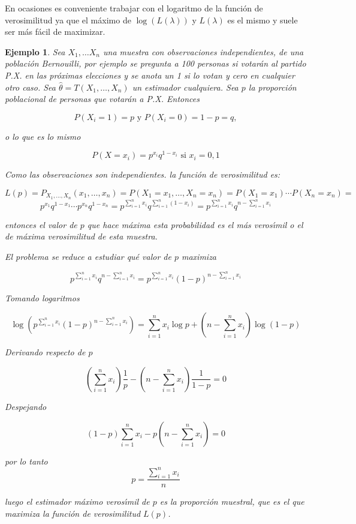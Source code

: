 \documentclass[12pt]{report}
\newtheorem{example}[definition]{Ejemplo}
\begin{document}
En ocasiones  es conveniente trabajar con el logaritmo de la funci\'on de verosimilitud ya
que el m\'aximo de $\log(L(\lambda))$ y $L(\lambda)$ es el mismo y suele ser m\'as f\'acil de
maximizar.




\begin{example}
 Sea $X_{1},\ldots X_{n}$ una muestra con observaciones
independientes, de una poblaci\'on Bernouilli, por ejemplo se pregunta a 100 personas si
votar\'an al partido P.X. en las pr\'oximas elecciones y se anota un 1 si lo votan y cero en
cualquier otro caso. Sea $\hat{\theta}=T(X_{1},\ldots,X_{n})$ un estimador cualquiera.  Sea
$p$ la proporci\'on poblacional de personas que votar\'an a P.X. Entonces

$$P(X_{i}=1)=p\mbox{ y }P(X_{i}=0)=1-p=q,$$

 o lo que es lo mismo

 $$P(X=x_{i})=p^{x_{i}} q^{1-x_{i}}\mbox{ si } x_{i}=0,1$$

Como las observaciones son independientes. la funci\'on de verosimilitud es:

$$L(p)=P_{X_{1},\ldots,X_{n}}(x_{1},\ldots,x_{n})=
     P(X_{1}=x_{1},\ldots,X_{n}=x_{n})=
P(X_{1}=x_{1})\cdots P(X_{n}=x_{n})= $$ $$ p^{x_{1}}q^{1-x_{1}}\cdots p^{x_{n}}q^{1-x_{n}}=
p^{\sum_{i=1}^n x_{i}} q^{\sum_{i=1}^n (1-x_{i})}
    = p^{\sum_{i=1}^n x_{i}} q^{n-\sum_{i=1}^n x_{i}}
$$


entonces el valor de $p$ que hace m\'axima esta probabilidad es el m\'as veros\'{\i}mil o el de
m\'axima verosimilitud de esta muestra.

El problema se reduce  a estudiar qu\'e valor de $p$ maximiza

$$p^{\sum_{i=1}^n x_{i}} q^{n-\sum_{i=1}^n x_{i}}=p^{\sum_{i=1}^n x_{i}}
(1-p)^{n-\sum_{i=1}^n x_{i}}$$

Tomando logaritmos

$$\log\left(p^{\sum_{i=1}^n x_{i}} (1-p)^{n-\sum_{i=1}^n x_{i}}\right)=\sum_{i=1}^n x_{i}
\log p + (n -\sum_{i=1}^n x_{i}) \log(1-p)$$


Derivando respecto de $p$

$$(\sum_{i=1}^n x_{i}) \frac{1}{p} - (n -\sum_{i=1}^n x_{i})\frac{1}{1-p}=0$$

Despejando

$$(1-p)\sum_{i=1}^n x_{i} -p (n-\sum_{i=1}^n x_{i})=0$$

por lo tanto $$p=\frac{\sum_{i=1}^n x_{i}}{n}$$

luego el estimador m\'aximo veros\'{\i}mil de $p$ es la proporci\'on muestral, que es el que
maximiza la funci\'on de verosimilitud $L(p)$.
\end{example}
\end{document}
